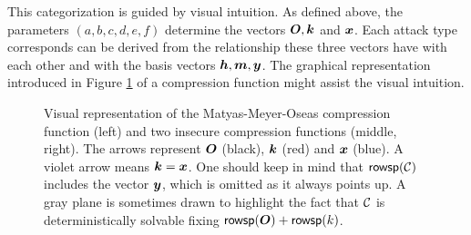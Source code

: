 This categorization is guided by visual intuition.
As defined above, the parameters $(a,b,c,d,e,f)$ determine the vectors $\boldsymbol{O}, \boldsymbol k$ and $\boldsymbol x$.
Each attack type corresponds can be derived from the relationship these three vectors have with each other and with the basis vectors $\boldsymbol h, \boldsymbol m, \boldsymbol y$.
The graphical representation introduced in Figure \ref{fig:graphical_rep} of a compression function might assist the visual intuition.
\begin{figure}[ht]
\centering

\hspace{0.5cm}
\hspace{0.5cm}
\caption{
Visual representation of the Matyas-Meyer-Oseas compression function (left) and two insecure compression functions (middle, right).
The arrows represent $\boldsymbol{O}$ (black), $\boldsymbol k$ (red) and $\boldsymbol x$ (blue).
A violet arrow means $\boldsymbol k = \boldsymbol x$.
One should keep in mind that $\mathsf{rowsp}(\mathcal{C})$ includes the vector $\boldsymbol y$, which is omitted as it always points up.
A gray plane is sometimes drawn to highlight the fact that $\mathcal{C}$ is deterministically solvable fixing $\mathsf{rowsp}(\boldsymbol{O}) + \mathsf{rowsp}(k)$.
}
\label{fig:graphical_rep}
\end{figure}

